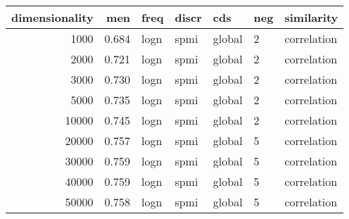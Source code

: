 \begin{tabular}{rrlllll}
\toprule
 dimensionality &    men &  freq & discr &     cds & neg &   similarity \\
\midrule
           1000 &  0.684 &  logn &  spmi &  global &   2 &  correlation \\
           2000 &  0.721 &  logn &  spmi &  global &   2 &  correlation \\
           3000 &  0.730 &  logn &  spmi &  global &   2 &  correlation \\
           5000 &  0.735 &  logn &  spmi &  global &   2 &  correlation \\
          10000 &  0.745 &  logn &  spmi &  global &   2 &  correlation \\
          20000 &  0.757 &  logn &  spmi &  global &   5 &  correlation \\
          30000 &  0.759 &  logn &  spmi &  global &   5 &  correlation \\
          40000 &  0.759 &  logn &  spmi &  global &   5 &  correlation \\
          50000 &  0.758 &  logn &  spmi &  global &   5 &  correlation \\
\bottomrule
\end{tabular}
